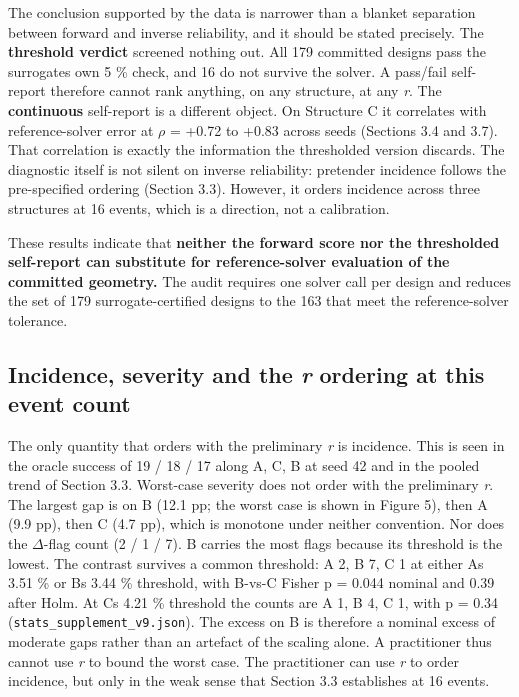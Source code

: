 \documentclass[11pt,a4paper]{article}
\begin{document}
The conclusion supported by the data is narrower than a blanket separation between forward and inverse reliability, and it should be stated precisely. The \textbf{threshold verdict} screened nothing out. All 179 committed designs pass
the surrogate\textquotesingle s own 5 \% check, and 16 do not survive the solver. A pass/fail self-report
therefore cannot rank anything, on any structure, at any \emph{r}. The \textbf{continuous}
self-report is a different object. On Structure C it correlates with reference-solver
error at \ensuremath{\rho} = +0.72 to +0.83 across seeds (Sections 3.4 and 3.7). That correlation is
exactly the information the thresholded version discards. The diagnostic itself is not
silent on inverse reliability: pretender incidence follows the pre-specified ordering
(Section 3.3). However, it orders incidence across three structures at 16 events, which is
a direction, not a calibration.

These results indicate that \textbf{neither the forward score nor the thresholded self-report can substitute for reference-solver evaluation of the committed geometry.} The audit requires one solver call per design and reduces the set of 179 surrogate-certified designs to the 163 that meet the reference-solver tolerance.

\subsection{\texorpdfstring{Incidence, severity and the \emph{r} ordering at this event count}{Incidence, severity and the r ordering at this event count}}\label{sec:4.2}

The only quantity that orders with the preliminary \emph{r} is incidence. This is seen in the
oracle success of 19 / 18 / 17 along A, C, B at seed 42 and in the pooled trend of
Section 3.3. Worst-case severity does not order with the preliminary \emph{r}. The largest gap
is on B (12.1 pp; the worst case is shown in Figure 5), then A (9.9 pp), then C (4.7 pp), which is monotone under neither
convention. Nor does the \ensuremath{\Delta}-flag count (2 / 1 / 7). B carries the most flags because its
threshold is the lowest. The contrast survives a common threshold: A 2, B 7, C 1 at either
A\textquotesingle s 3.51 \% or B\textquotesingle s 3.44 \% threshold, with B-vs-C Fisher p = 0.044 nominal and 0.39 after
Holm. At C\textquotesingle s 4.21 \% threshold the counts are A 1, B 4, C 1, with p = 0.34
(\texttt{stats\_\allowbreak{}supplement\_\allowbreak{}v9.\allowbreak{}json}). The excess on B is therefore a nominal excess of moderate
gaps rather than an artefact of the scaling alone. A practitioner thus cannot use \emph{r} to
bound the worst case. The practitioner can use \emph{r} to order incidence, but only in the
weak sense that Section 3.3 establishes at 16 events.
\end{document}

